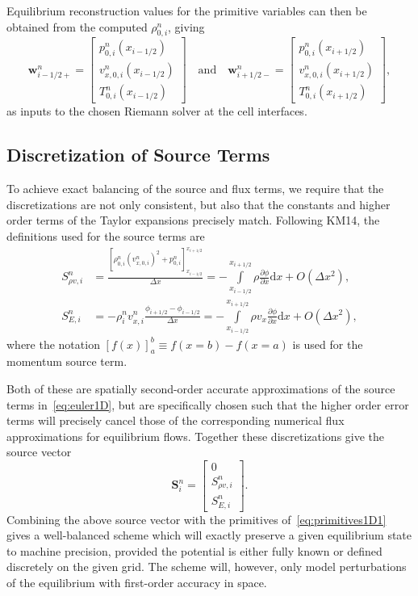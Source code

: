 Equilibrium reconstruction values for the primitive variables can then be obtained from the computed $\rho_{0,i}^n$, giving
\begin{equation} \label{eq:primitives1D1}
\mathbf{w}_{i-1/2+}^n=
\begin{bmatrix}
p_{0,i}^n(x_{i-1/2}) \\ v_{x,0,i}^n(x_{i-1/2}) \\ T_{0,i}^n(x_{i-1/2})
\end{bmatrix}
\quad \textrm{and} \quad \mathbf{w}_{i+1/2-}^n=
\begin{bmatrix}
p_{0,i}^n(x_{i+1/2}) \\ v_{x,0,i}^n(x_{i+1/2}) \\ T_{0,i}^n(x_{i+1/2})
\end{bmatrix},
\end{equation}
as inputs to the chosen Riemann solver at the cell interfaces.

\subsection{Discretization of Source Terms}
\label{subsec:sources}

To achieve exact balancing of the source and flux terms, we require that the discretizations are not only consistent, but also that the constants and higher order terms of the Taylor expansions precisely match. Following KM14, the definitions used for the source terms are
\begin{align}
S_{\rho v,i}^n&=\frac{\left[\rho_{0,i}^n\left(v_{x,0,i}^n\right)^2+p_{0,i}^n\right]_{x_{i-1/2}}^{x_{i+1/2}}}{\Delta x}=-\int\limits_{x_{i-1/2}}^{x_{i+1/2}}\rho \frac{\partial \phi}{\partial x}\textrm{d}x+O\left(\Delta x^2\right), \label{eq:momentumSource} \\
S_{E,i}^n&=-\rho_i^n v_{x,i}^n\frac{\phi_{i+1/2}-\phi_{i-1/2}}{\Delta x}=-\int\limits_{x_{i-1/2}}^{x_{i+1/2}}\rho v_x \frac{\partial \phi}{\partial x}\textrm{d}x+O\left(\Delta x^2\right), \label{eq:energySource}
\end{align}
where the notation $\left[f(x)\right]_a^b\equiv f(x=b)-f(x=a)$ is used for the momentum source term.

Both of these are spatially second-order accurate approximations of the source terms in~\eqref{eq:euler1D}, but are specifically chosen such that the higher order error terms will precisely cancel those of the corresponding numerical flux approximations for equilibrium flows. Together these discretizations give the source vector
\begin{equation} \label{eq:sourceVector}
\mathbf{S}_i^n=
\begin{bmatrix}
0 \\ S_{\rho v,i}^n \\ S_{E,i}^n
\end{bmatrix}.
\end{equation}
Combining the above source vector with the primitives of~\eqref{eq:primitives1D1} gives a well-balanced scheme which will exactly preserve a given equilibrium state to machine precision, provided the potential is either fully known or defined discretely on the given grid. The scheme will, however, only model perturbations of the equilibrium with first-order accuracy in space.

